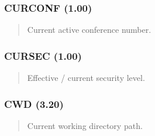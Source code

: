\documentclass[letterpaper,10pt,english]{sphinxmanual}
\begin{document}
\subsubsection{CURCONF (1.00)}
\label{\detokenize{ppl:curconf-1-00}}\begin{quote}

\sphinxAtStartPar
{}
\begin{description}
\sphinxAtStartPar
Current active conference number.

\end{description}
\end{quote}


\subsubsection{CURSEC (1.00)}
\label{\detokenize{ppl:cursec-1-00}}\begin{quote}

\sphinxAtStartPar
{}
\begin{description}
\sphinxAtStartPar
Effective / current security level.

\end{description}
\end{quote}


\subsubsection{CWD (3.20)}
\label{\detokenize{ppl:cwd-3-20}}\begin{quote}

\sphinxAtStartPar
{}
\begin{description}
\sphinxAtStartPar
Current working directory path.

\end{description}

\sphinxAtStartPar
{}
\begin{quote}

\begin{sphinxVerbatim}[commandchars=\\\{\}]
  
\end{sphinxVerbatim}
\end{quote}
\end{quote}
\end{document}
